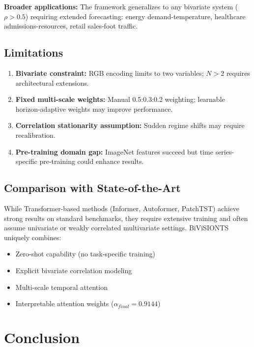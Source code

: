\documentclass[preprint,12pt,authoryear]{elsarticle}
\begin{document}
\textbf{Broader applications:} The framework generalizes to any bivariate system ($\rho>0.5$) requiring extended forecasting: energy demand-temperature, healthcare admissions-resources, retail sales-foot traffic.

\subsection{Limitations}

\begin{enumerate}
    \item \textbf{Bivariate constraint:} RGB encoding limits to two variables; $N>2$ requires architectural extensions.
    \item \textbf{Fixed multi-scale weights:} Manual 0.5:0.3:0.2 weighting; learnable horizon-adaptive weights may improve performance.
    \item \textbf{Correlation stationarity assumption:} Sudden regime shifts may require recalibration.
    \item \textbf{Pre-training domain gap:} ImageNet features succeed but time series-specific pre-training could enhance results.
\end{enumerate}

\subsection{Comparison with State-of-the-Art}

While Transformer-based methods (Informer, Autoformer, PatchTST) achieve strong results on standard benchmarks, they require extensive training and often assume univariate or weakly correlated multivariate settings. BiViSIONTS uniquely combines:
\begin{itemize}
    \item Zero-shot capability (no task-specific training)
    \item Explicit bivariate correlation modeling
    \item Multi-scale temporal attention
    \item Interpretable attention weights ($\alpha_{final}=0.9144$)
\end{itemize}

\section{Conclusion}
\label{sec:conclusion}
\end{document}
